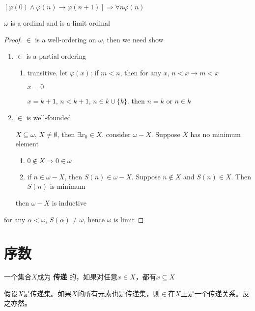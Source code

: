 \documentclass[11pt]{article}
\begin{document}
\([\varphi(0)\wedge\varphi(n)\to\varphi(n+1)]\Rightarrow\forall n\varphi(n)\)

\begin{theorem}[]
\(\omega\) is a ordinal and is a limit ordinal
\end{theorem}

\begin{proof}
\(\in\) is a well-ordering on \(\omega\), then we need show
\begin{enumerate}
\item \(\in\) is a partial ordering
\begin{enumerate}
\item transitive. let \(\varphi(x)\): if \(m<n\), then for any \(x\), \(n<x\to m<x\)

\(x=0\)

\(x=k+1\), \(n<k+1\), \(n\in k\cup\{k\}\). then \(n=k\) or \(n\in k\)
\end{enumerate}
\item \(\in\) is well-founded

\(X\subseteq\omega\), \(X\neq\emptyset\), then \(\exists x_0\in X\). consider \(\omega-X\). Suppose \(X\) has no minimum element
\begin{enumerate}
\item \(0\not\in X\Rightarrow 0\in\omega\)

\item if \(n\in\omega-X\), then \(S(n)\in\omega-X\). Suppose \(n\not\in X\) and \(S(n)\in X\). Then \(S(n)\) is minimum
\end{enumerate}

then \(\omega-X\) is inductive
\end{enumerate}



for any \(\alpha<\omega\), \(S(\alpha)\neq\omega\), hence \(\omega\) is limit
\end{proof}
\section{序数}
\label{sec:orge0799da}
\begin{definition}[]
一个集合\(X\)成为 \textbf{传递} 的，如果对任意\(x\in X\)，都有\(x\subseteq X\)
\end{definition}

\begin{proposition}[]
假设\(X\)是传递集。如果\(X\)的所有元素也是传递集，则\(\in\)在\(X\)上是一个传递关系。反之亦然。
\end{proposition}
\end{document}
